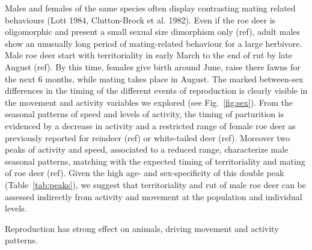 \documentclass[a4paper,11pt]{article}
\begin{document}
Males and females of the same species often display contrasting mating
related behaviours (Lott 1984, Clutton-Brock et al. 1982). Even if the
roe deer is oligomorphic and present a small sexual size dimorphism
only (ref), adult males show an unusually long period of
mating-related behaviour for a large herbivore. Male roe deer start
with territoriality in early March to the end of rut by late August
(ref). By this time, females give birth around June, raise there fawns
for the next 6 months, while mating takes place in August. The marked
between-sex differences in the timing of the different events of
reproduction is clearly visible in the movement and activity variables
we explored (see Fig.~\ref{fig:sex}). From the seasonal patterns of
speed and levels of activity, the timing of parturition is evidenced
by a decrease in activity and a restricted range of female roe deer as
previously reported for reindeer (ref) or white-tailed deer
(ref). Moreover two peaks of activity and speed, associated to a
reduced range, characterize male seasonal patterns, matching with the
expected timing of territoriality and mating of roe deer (ref). Given
the high age- and sex-specificity of this double peak
(Table~\ref{tab:peaks}), we suggest that territoriality and rut of
male roe deer can be assessed indirectly from activity and movement at
the population and individual levels.

Reproduction has strong effect on animals, driving movement and
activity patterns.




\end{document}
